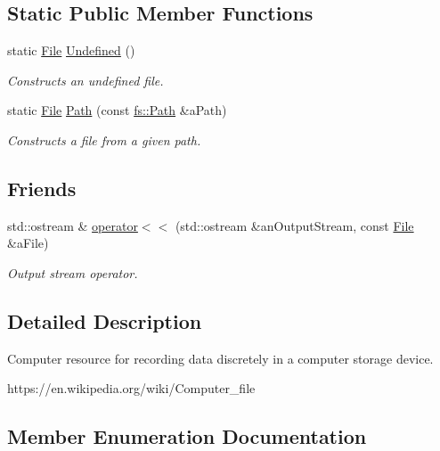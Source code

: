 \subsection*{Static Public Member Functions}
\begin{DoxyCompactItemize}
\item 
static \hyperlink{classlibrary_1_1core_1_1fs_1_1_file}{File} \hyperlink{classlibrary_1_1core_1_1fs_1_1_file_af45fa5c36c359a979149845ef06586e6}{Undefined} ()
\begin{DoxyCompactList}\small\item\em Constructs an undefined file. \end{DoxyCompactList}\item 
static \hyperlink{classlibrary_1_1core_1_1fs_1_1_file}{File} \hyperlink{classlibrary_1_1core_1_1fs_1_1_file_a72d6cdf8bb7e299889c6149e2b8a6cc7}{Path} (const \hyperlink{classlibrary_1_1core_1_1fs_1_1_path}{fs\+::\+Path} \&a\+Path)
\begin{DoxyCompactList}\small\item\em Constructs a file from a given path. \end{DoxyCompactList}\end{DoxyCompactItemize}
\subsection*{Friends}
\begin{DoxyCompactItemize}
\item 
std\+::ostream \& \hyperlink{classlibrary_1_1core_1_1fs_1_1_file_a82ce9f27653427d53ecb90de978f4f68}{operator$<$$<$} (std\+::ostream \&an\+Output\+Stream, const \hyperlink{classlibrary_1_1core_1_1fs_1_1_file}{File} \&a\+File)
\begin{DoxyCompactList}\small\item\em Output stream operator. \end{DoxyCompactList}\end{DoxyCompactItemize}


\subsection{Detailed Description}
Computer resource for recording data discretely in a computer storage device. 

https\+://en.wikipedia.\+org/wiki/\+Computer\+\_\+file 

\subsection{Member Enumeration Documentation}
\mbox{\label{classlibrary_1_1core_1_1fs_1_1_file_ac18b7d7ee50c803cbd0087b0f71ce4f7}} 
